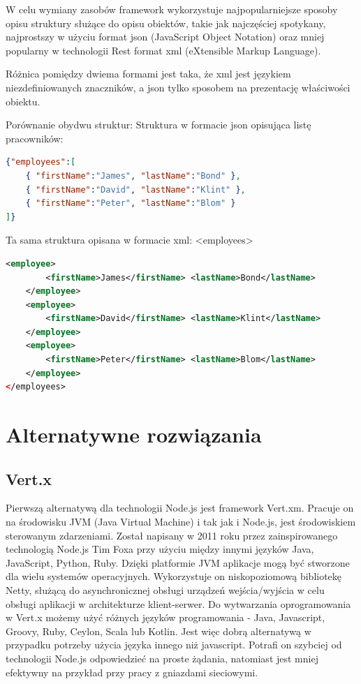 \documentclass[12pt]{report}
\begin{document}
W celu wymiany zasobów framework wykorzystuje najpopularniejsze sposoby opisu struktury służące do opisu obiektów, takie jak najczęściej spotykany, najprostszy w użyciu format json (JavaScript Object Notation) oraz mniej popularny w technologii Rest format xml (eXtensible Markup Language).

Różnica pomiędzy dwiema formami jest taka, że xml jest językiem niezdefiniowanych znaczników, a json tylko sposobem na prezentację właściwości obiektu.

Porównanie obydwu struktur:
Struktura w formacie json opisująca listę pracowników:
\begin{lstlisting}[language=json,firstnumber=1]
{"employees":[
	{ "firstName":"James", "lastName":"Bond" },
	{ "firstName":"David", "lastName":"Klint" },
	{ "firstName":"Peter", "lastName":"Blom" }
]}
\end{lstlisting}
\newpage
Ta sama struktura opisana w formacie xml:
<employees>
\begin{lstlisting}[language=XML,firstnumber=1]
	<employee>
		<firstName>James</firstName> <lastName>Bond</lastName>
	</employee>
	<employee>
		<firstName>David</firstName> <lastName>Klint</lastName>
	</employee>
	<employee>
		<firstName>Peter</firstName> <lastName>Blom</lastName>
	</employee>
</employees>
\end{lstlisting}

\section{Alternatywne rozwiązania}
\subsection{Vert.x}
Pierwszą alternatywą dla technologii Node.js jest framework Vert.xm.
Pracuje on na środowisku JVM (Java Virtual Machine) i tak jak i Node.js, jest środowiskiem sterowanym zdarzeniami.
Został napisany w 2011 roku przez zainspirowanego technologią Node.js Tim Foxa przy użyciu między innymi języków Java, JavaScript, Python, Ruby.
Dzięki platformie JVM aplikacje mogą być stworzone dla wielu systemów operacyjnych.
Wykorzystuje on niskopoziomową bibliotekę Netty, służącą do asynchronicznej obsługi urządzeń wejścia/wyjścia w celu obsługi aplikacji w architekturze klient-serwer.
Do wytwarzania oprogramowania w Vert.x możemy użyć różnych języków programowania - Java, Javascript, Groovy, Ruby, Ceylon, Scala lub Kotlin.
Jest więc dobrą alternatywą w przypadku potrzeby użycia języka innego niż javascript.
Potrafi on szybciej od technologii Node.js odpowiedzieć na proste żądania, natomiast jest mniej efektywny na przykład przy pracy z gniazdami sieciowymi.
\end{document}
